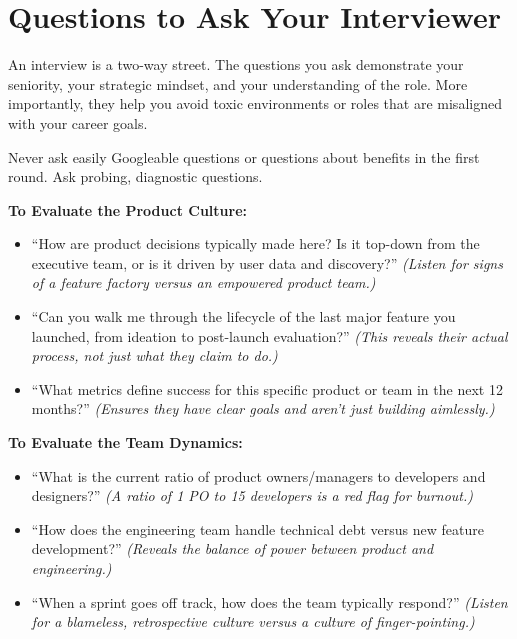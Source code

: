 \documentclass[
  11pt,
  openany,
  oneside]{book}
\providecommand{\tightlist}{%
  \setlength{\itemsep}{0pt}\setlength{\parskip}{0pt}}
\begin{document}
\bigskip

\section{Questions to Ask Your
Interviewer}\label{questions-to-ask-your-interviewer}

An interview is a two-way street. The questions you ask demonstrate your
seniority, your strategic mindset, and your understanding of the role.
More importantly, they help you avoid toxic environments or roles that
are misaligned with your career goals.

Never ask easily Googleable questions or questions about benefits in the
first round. Ask probing, diagnostic questions.

\textbf{To Evaluate the Product Culture:}

\begin{itemize}
\tightlist
\item
  ``How are product decisions typically made here? Is it top-down from
  the executive team, or is it driven by user data and discovery?''
  \emph{(Listen for signs of a feature factory versus an empowered
  product team.)}
\item
  ``Can you walk me through the lifecycle of the last major feature you
  launched, from ideation to post-launch evaluation?'' \emph{(This
  reveals their actual process, not just what they claim to do.)}
\item
  ``What metrics define success for this specific product or team in the
  next 12 months?'' \emph{(Ensures they have clear goals and aren't just
  building aimlessly.)}
\end{itemize}

\textbf{To Evaluate the Team Dynamics:}

\begin{itemize}
\tightlist
\item
  ``What is the current ratio of product owners/managers to developers
  and designers?'' \emph{(A ratio of 1 PO to 15 developers is a red flag
  for burnout.)}
\item
  ``How does the engineering team handle technical debt versus new
  feature development?'' \emph{(Reveals the balance of power between
  product and engineering.)}
\item
  ``When a sprint goes off track, how does the team typically respond?''
  \emph{(Listen for a blameless, retrospective culture versus a culture
  of finger-pointing.)}
\end{itemize}
\end{document}
